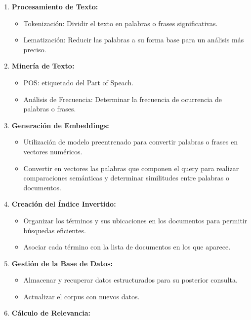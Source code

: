 \documentclass[
  10,
  openany]{book}
\begin{document}
\begin{enumerate}
\def\labelenumi{\arabic{enumi}.}
\item
  \textbf{Procesamiento de Texto:}

  \begin{itemize}
  \item
    Tokenización: Dividir el texto en palabras o frases significativas.
  \item
    Lematización: Reducir las palabras a su forma base para un análisis más preciso.
  \end{itemize}
\item
  \textbf{Minería de Texto:}

  \begin{itemize}
  \item
    POS: etiquetado del Part of Speach.
  \item
    Análisis de Frecuencia: Determinar la frecuencia de ocurrencia de palabras o frases.
  \end{itemize}
\item
  \textbf{Generación de Embeddings:}

  \begin{itemize}
  \item
    Utilización de modelo preentrenado para convertir palabras o frases en vectores numéricos.
  \item
    Convertir en vectores las palabras que componen el query para realizar comparaciones semánticas y determinar similitudes entre palabras o documentos.
  \end{itemize}
\item
  \textbf{Creación del Índice Invertido:}

  \begin{itemize}
  \item
    Organizar los términos y sus ubicaciones en los documentos para permitir búsquedas eficientes.
  \item
    Asociar cada término con la lista de documentos en los que aparece.
  \end{itemize}
\item
  \textbf{Gestión de la Base de Datos:}

  \begin{itemize}
  \item
    Almacenar y recuperar datos estructurados para su posterior consulta.
  \item
    Actualizar el corpus con nuevos datos.
  \end{itemize}
\item
  \textbf{Cálculo de Relevancia:}


\end{enumerate}
\end{document}
